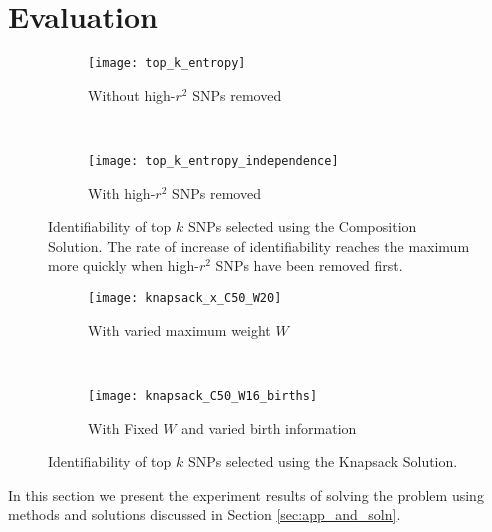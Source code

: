 \documentclass[14pt, oneside]{article}   	%
\begin{document}
\section{Evaluation}
\begin{figure}[t]
    \centering
    \begin{subfigure}{0.45\textwidth}
        \texttt{[image: top\_k\_entropy]}
        \caption{Without high-$r^2$ SNPs removed}
        \label{fig:ent}
    \end{subfigure}
    ~ %
    \begin{subfigure}{0.45\textwidth}
        \texttt{[image: top\_k\_entropy\_independence]}
        \caption{With high-$r^2$ SNPs removed}
        \label{fig:ent_indep}
    \end{subfigure}
    \caption{Identifiability of top $k$ SNPs selected using the Composition Solution.
                  The rate of increase of identifiability reaches the maximum more quickly when high-$r^2$ SNPs have been removed first.}
    \label{fig:topk_ents}
\end{figure}
\begin{figure}[t]
    \centering
    \begin{subfigure}{0.45\textwidth}
        \texttt{[image: knapsack\_x\_C50\_W20]}
        \caption{With varied maximum weight $W$}
        \label{fig:C50W20}
    \end{subfigure}
    ~ %
    \begin{subfigure}{0.45\textwidth}
        \texttt{[image: knapsack\_C50\_W16\_births]}
        \caption{With Fixed $W$ and varied birth information}
        \label{fig:C50W16births}
    \end{subfigure}
    \caption{Identifiability of top $k$ SNPs selected using the Knapsack Solution.}
    \label{fig:knapsack}
\end{figure}

In this section we present the experiment results of solving the problem using methods and solutions discussed in Section \ref{sec:app_and_soln}.
\end{document}
